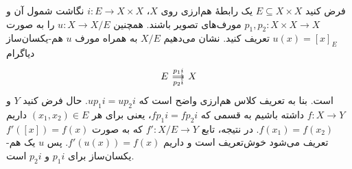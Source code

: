 فرض کنید $E \subseteq X \times X$ یک رابطهٔ هم‌ارزی روی $X$، $i : E \to X \times X$ نگاشت شمول آن و $p_1, p_2 : X \times X \to X$ مورف‌های تصویر باشند. همچنین $u : X \to X/E$ را به صورت $u(x) = [x]_E$ تعریف کنید. نشان می‌دهیم $X/E$ به همراه مورف $u$ هم-یکسان‌ساز دیاگرام
$$\begin{tikzcd}[sep=small]
E \arrow[r, "p_1 i", shift left=.2ex] \arrow[r, "p_2 i"', shift right=.2ex] & X
\end{tikzcd}$$
است. بنا به تعریف کلاس هم‌ارزی واضح است که $u p_1 i = u p_2 i$. حال فرض کنید $Y$ و $f : X \to Y$ داشته باشیم به قسمی که $f p_1 i = f p_2 i$، یعنی برای هر $(x_1, x_2) \in E$ داریم $f(x_1) = f(x_2)$. در نتیجه، تابع $f' : X/E \to Y$ که به صورت $f'([x]) = f(x)$ تعریف می‌شود خوش‌تعریف است و داریم $f'(u(x)) = f(x)$. پس $u$ یک هم-یکسان‌ساز برای $p_1 i$ و $p_2 i$ است.
